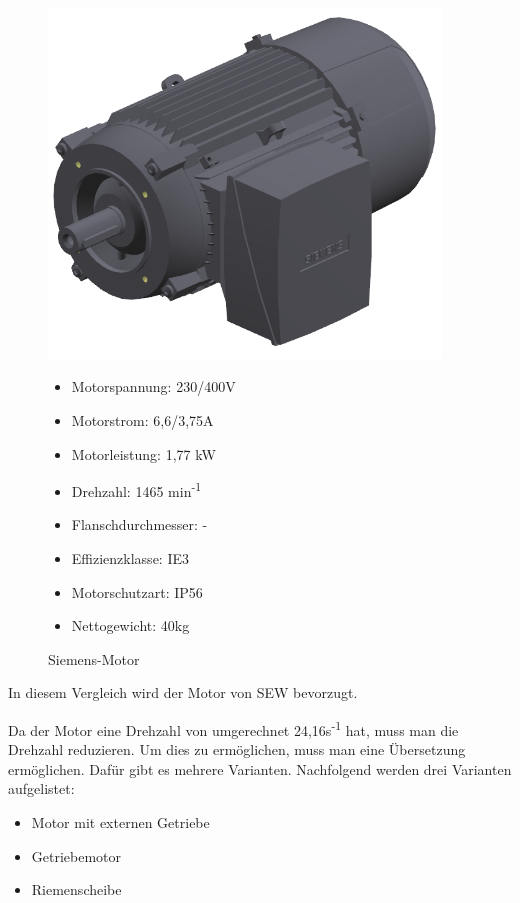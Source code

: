 \begin{figure}[H]
\begin{minipage}[t]{0.45\textwidth}
\includegraphics[width=0.93\textwidth]{fig/SiemensMotor}
\caption{Siemens-Motor \cite{siemensCAD}}

\begin{itemize}
	\item{Motorspannung: 230/400V}
	\item{Motorstrom: 6,6/3,75A}
	\item{Motorleistung: 1,77 kW}
	\item{Drehzahl: 1465 min\textsuperscript{-1}}
	\item{Flanschdurchmesser: -}
	\item{Effizienzklasse: IE3}
	\item{Motorschutzart: IP56}
	\item{Nettogewicht: 40kg}
\end{itemize}

\end{minipage}
\end{figure}

In diesem Vergleich wird der Motor von SEW bevorzugt.

Da der Motor eine Drehzahl von umgerechnet 24,16s\textsuperscript{-1} hat, muss man die Drehzahl reduzieren. Um dies zu ermöglichen, muss man eine Übersetzung ermöglichen. Dafür gibt es mehrere Varianten. Nachfolgend werden drei Varianten aufgelistet:

\begin{itemize}
	\item{Motor mit externen Getriebe}
	\item{Getriebemotor}
	\item{Riemenscheibe}
\end{itemize}


